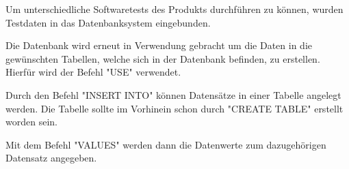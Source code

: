 
Um unterschiedliche Softwaretests des Produkts durchführen zu können, wurden Testdaten in das Datenbanksystem eingebunden.


Die Datenbank wird erneut in Verwendung gebracht um die Daten in die gewünschten Tabellen, welche sich in der Datenbank befinden, zu erstellen. Hierfür wird der Befehl "USE" verwendet.


Durch den Befehl "INSERT INTO" können Datensätze in einer Tabelle angelegt werden. Die Tabelle sollte im Vorhinein schon durch "CREATE TABLE" erstellt worden sein.


Mit dem Befehl "VALUES" werden dann die Datenwerte zum dazugehörigen Datensatz angegeben.

